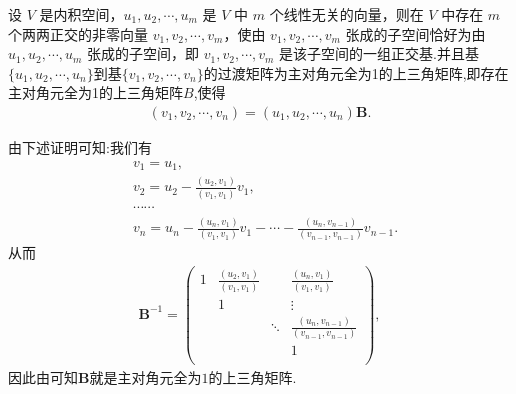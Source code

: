 \documentclass[../../main.tex]{subfiles}
\begin{document}
\begin{theorem}\label{theorem:Gram-Schmidt正交化方法}
设 $V$ 是内积空间，$u_1, u_2, \cdots, u_m$ 是 $V$ 中 $m$ 个线性无关的向量，则在 $V$ 中存在 $m$ 个两两正交的非零向量 $v_1, v_2, \cdots, v_m$，使由 $v_1, v_2, \cdots, v_m$ 张成的子空间恰好为由 $u_1, u_2, \cdots, u_m$ 张成的子空间，即 $v_1, v_2, \cdots, v_m$ 是该子空间的一组正交基.并且基$\{u_1,u_2,\cdots,u_n\}$到基$\{v_1,v_2,\cdots,v_n\}$的过渡矩阵为主对角元全为1的上三角矩阵,即存在主对角元全为1的上三角矩阵$B$,使得
\begin{align*}
(v_1,v_2,\cdots,v_n)=(u_1,u_2,\cdots,u_n)\boldsymbol{B}.
\end{align*}
\end{theorem}
\begin{note}
由下述证明可知:我们有
\begin{align*}
&v_1=u_1,
\\
&v_2=u_2-\frac{(u_2,v_1)}{(v_1,v_1)}v_1,
\\
&\cdots \cdots 
\\
&v_n=u_n-\frac{(u_n,v_1)}{(v_1,v_1)}v_1-\cdots -\frac{(u_n,v_{n-1})}{(v_{n-1},v_{n-1})}v_{n-1}.
\end{align*}
从而
\begin{align*}
\boldsymbol{B}^{-1}=\begin{pmatrix}
1&		\frac{( u_2,v_1 )}{( v_1,v_1 )}&		&		\frac{( u_n,v_1 )}{( v_1,v_1 )}\\
&		1&		&		\vdots\\
&		&		\ddots&		\frac{( u_n,v_{n-1} )}{( v_{n-1},v_{n-1} )}\\
&		&		&		1\\
\end{pmatrix},
\end{align*}
因此由可知$\boldsymbol{B}$就是主对角元全为$1$的上三角矩阵.
\end{note}
\end{document}
